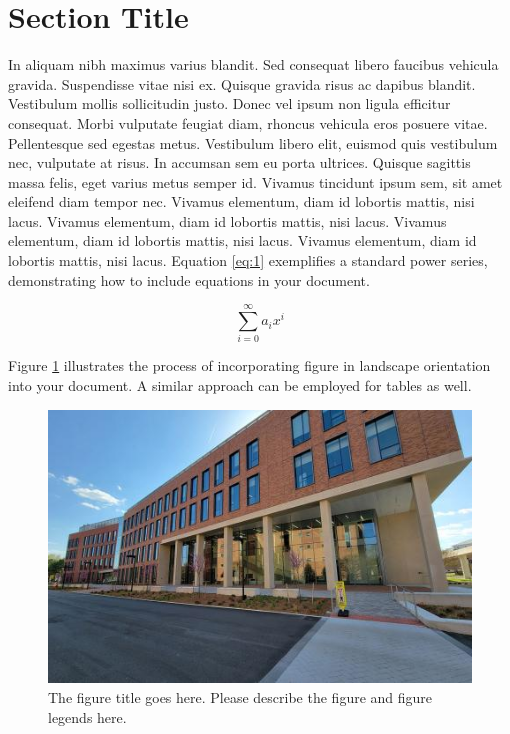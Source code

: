 

\section{Section Title}
In aliquam nibh maximus varius blandit. Sed consequat libero faucibus vehicula gravida. Suspendisse vitae nisi ex. Quisque gravida risus ac dapibus blandit. Vestibulum mollis sollicitudin justo. Donec vel ipsum non ligula efficitur consequat. Morbi vulputate feugiat diam, rhoncus vehicula eros posuere vitae. Pellentesque sed egestas metus. Vestibulum libero elit, euismod quis vestibulum nec, vulputate at risus. In accumsan sem eu porta ultrices. Quisque sagittis massa felis, eget varius metus semper id. Vivamus tincidunt ipsum sem, sit amet eleifend diam tempor nec. Vivamus elementum, diam id lobortis mattis, nisi lacus. Vivamus elementum, diam id lobortis mattis, nisi lacus. Vivamus elementum, diam id lobortis mattis, nisi lacus. Vivamus elementum, diam id lobortis mattis, nisi lacus. 
Equation \ref{eq:1} exemplifies a standard power series, demonstrating how to include equations in your document.

\begin{equation} \label{eq:1}
\sum_{i=0}^{\infty} a_i x^i
\end{equation}

Figure \ref{fig:logo_landscape} illustrates the process of incorporating figure in landscape orientation into your document. A similar approach can be employed for tables as well.


\begin{figure}
\includegraphics[width=\columnwidth]{Figures/cos_landscape.jpg}
\caption[The figure title goes here.]{The figure title goes here. Please describe the figure and figure legends here.}
\label{fig:logo_landscape}
\end{figure}